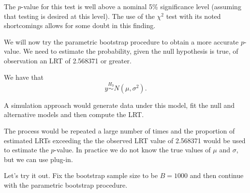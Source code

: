 \documentclass[
  ignorenonframetext,
]{beamer}
\begin{document}
\begin{frame}{}
\protect\hypertarget{section-4}{}
The \(p\)-value for this test is well above a nominal 5\% significance
level (assuming that testing is desired at this level). The use of the
\(\chi^2\) test with its noted shortcomings allows for some doubt in
this finding.

We will now try the parametric bootstrap procedure to obtain a more
accurate \(p\)-value. We need to estimate the probability, given the
null hypothesis is true, of observation an LRT of 2.568371 or greater.

We have that \[
  y \overset{H_0}{\sim} N(\mu,\sigma^2).
\]
\end{frame}

\begin{frame}{}
\protect\hypertarget{section-5}{}
A simulation approach would generate data under this model, fit the null
and alternative models and then compute the LRT.

The process would be repeated a large number of times and the proportion
of estimated LRTs exceeding the the observed LRT value of 2.568371 would
be used to estimate the \(p\)-value. In practice we do not know the true
values of \(\mu\) and \(\sigma\), but we can use plug-in.

Let's try it out. Fix the bootstrap sample size to be \(B = 1000\) and
then continue with the parametric bootstrap procedure.
\end{frame}
\end{document}
